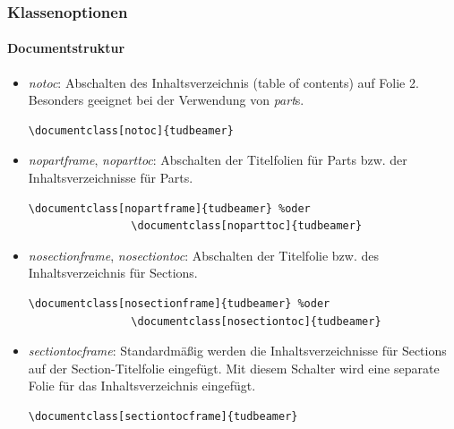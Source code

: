 \documentclass[german,notoc]{tudbeamer}%
\begin{document}
\begin{frame}[fragile]
	\frametitle{Klassenoptionen}
	\framesubtitle{Documentstruktur}

	\begin{itemize}
		\item \emph{notoc}: Abschalten des Inhaltsverzeichnis (table of contents) auf Folie 2. Besonders geeignet bei der Verwendung von \emph{part}s.
			\begin{lstlisting}[gobble=8,style=latex,numbers=none]
				\documentclass[notoc]{tudbeamer}
			\end{lstlisting} 
		\item \emph{nopartframe}, \emph{noparttoc}: Abschalten der Titelfolien für Parts bzw. der Inhaltsverzeichnisse für Parts.
			\begin{lstlisting}[gobble=8,style=latex]
				\documentclass[nopartframe]{tudbeamer} %oder
				\documentclass[noparttoc]{tudbeamer} 
			\end{lstlisting} 
		\item \emph{nosectionframe}, \emph{nosectiontoc}: Abschalten der Titelfolie bzw. des Inhaltsverzeichnis für Sections.
			\begin{lstlisting}[gobble=8,style=latex]
				\documentclass[nosectionframe]{tudbeamer} %oder
				\documentclass[nosectiontoc]{tudbeamer} 
			\end{lstlisting} 
		\item \emph{sectiontocframe}: Standardmäßig werden die Inhaltsverzeichnisse für Sections auf der Section-Titelfolie eingefügt. Mit diesem Schalter wird eine separate Folie für das Inhaltsverzeichnis eingefügt.
			\begin{lstlisting}[gobble=8,style=latex,numbers=none]
				\documentclass[sectiontocframe]{tudbeamer}
			\end{lstlisting} 
	\end{itemize}
\end{frame}
\end{document}
